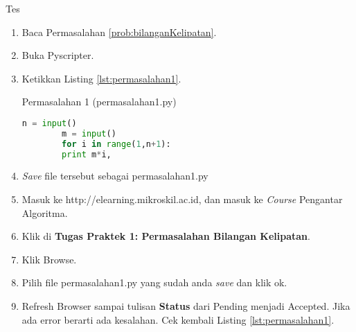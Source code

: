 \begin{panduan}{Tes}
\begin{enumerate}
	\item Baca Permasalahan \ref{prob:bilanganKelipatan}.
	\item Buka Pyscripter.
	\item Ketikkan Listing \ref{lst:permasalahan1}.
	\begin{listprog}{Permasalahan 1 (permasalahan1.py)}
		\label{lst:permasalahan1}
		\begin{lstlisting}[language=Python]
		n = input()
		m = input()
		for i in range(1,n+1):
	    print m*i,
		\end{lstlisting}
	\end{listprog}
	\item \textit{Save} file tersebut sebagai permasalahan1.py
	\item Masuk ke http://elearning.mikroskil.ac.id, dan masuk ke \textit{Course} Pengantar Algoritma.
	\item Klik di \textbf{Tugas Praktek 1: Permasalahan Bilangan Kelipatan}.
	\item Klik Browse.
	\item Pilih file permasalahan1.py yang sudah anda \textit{save} dan klik ok.
	\item Refresh Browser sampai tulisan \textbf{Status} dari Pending menjadi Accepted. Jika ada error berarti ada kesalahan. Cek kembali Listing \ref{lst:permasalahan1}.
\end{enumerate}
\end{panduan}

